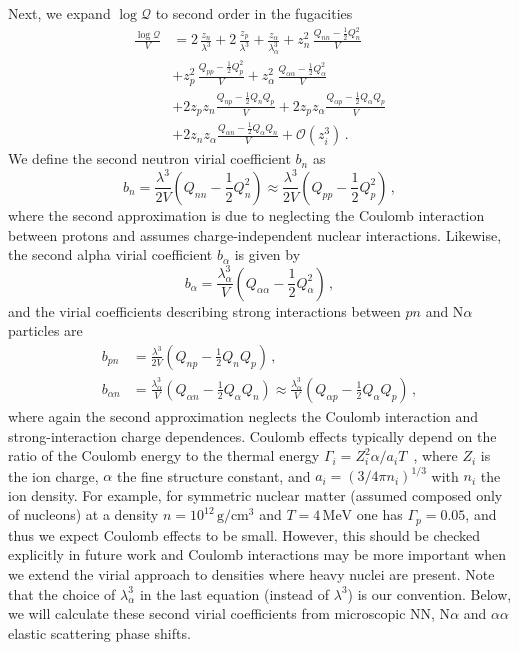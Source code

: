 \documentclass[aps,prc,twocolumn,showpacs,showkeys,amsmath,amssymb]{revtex4}
\newcommand{\mev}{\, \text{MeV}}
\newcommand{\gcq}{\, \text{g}/\text{cm}^{3}}
\begin{document}
Next, we expand $\log \mathcal{Q}$ to second order in the fugacities
\begin{align}
\frac{\log \mathcal{Q}}{V} &= 2 \, \frac{z_n}{\lambda^3} + 2 \, 
\frac{z_p}{\lambda^3} + \frac{z_\alpha}{\lambda_\alpha^3} +
z_n^2 \, \frac{Q_{nn}-\frac{1}{2}Q_n^2}{V} \nonumber \\[1mm]
&+ z_p^2 \, \frac{Q_{pp}-\frac{1}{2}Q_p^2}{V} 
+ z_\alpha^2 \, \frac{Q_{\alpha\alpha}-\frac{1}{2}Q_\alpha^2}{V} 
\nonumber \\[1mm]
&+ 2 z_p z_n \frac{Q_{np}-\frac{1}{2}Q_nQ_p}{V} 
+ 2 z_p z_\alpha \frac{Q_{\alpha p}-\frac{1}{2}Q_\alpha Q_p}{V} 
\nonumber \\[1mm]
&+ 2 z_n z_\alpha \frac{Q_{\alpha n}-\frac{1}{2}Q_\alpha Q_n}{V} 
+ \mathcal{O}(z_i^3) \,.
\end{align}
We define the second neutron virial coefficient $b_n$ as
\begin{equation}
b_n = \frac{\lambda^3}{2V}(Q_{nn}-\frac{1}{2}Q_n^2) \approx 
\frac{\lambda^3}{2V}(Q_{pp}-\frac{1}{2}Q_p^2) \,,
\end{equation}
where the second approximation is due to neglecting the Coulomb 
interaction between protons and assumes charge-independent
nuclear interactions.  Likewise, the second alpha virial coefficient 
$b_\alpha$ is given by
\begin{equation}
b_\alpha=\frac{\lambda_\alpha^3}{V}(Q_{\alpha\alpha}-\frac{1}{2}Q_\alpha^2) \,,
\end{equation}
and the virial coefficients describing strong interactions between 
$pn$ and N$\alpha$ particles are
\begin{align}
b_{pn}&=\frac{\lambda^3}{2V}(Q_{np}-\frac{1}{2}Q_nQ_p) \,, \\[1mm]
b_{\alpha n}&=\frac{\lambda_\alpha^3}{V}(Q_{\alpha n}-\frac{1}{2}Q_\alpha Q_n)
\approx \frac{\lambda_\alpha^3}{V}(Q_{\alpha p}-\frac{1}{2}Q_\alpha Q_p) \,,
\end{align}
where again the second approximation neglects the Coulomb 
interaction and strong-interaction charge dependences.
Coulomb effects typically depend on the ratio of the Coulomb energy to the
thermal energy $\Gamma_i = Z_i^2 \alpha/a_i T$~\cite{Ichimaru}, where
$Z_i$ is the ion charge, $\alpha$ the fine structure constant, and
$a_i = (3/4 \pi n_i)^{1/3}$ with $n_i$ the ion density. For example, for
symmetric nuclear matter (assumed composed only of nucleons) at a density
$n=10^{12} \gcq$ and $T=4 \mev$ one has $\Gamma_p = 0.05$, and thus we
expect Coulomb effects to be small. However, this should be checked
explicitly in future work and Coulomb interactions may be more important
when we extend the virial approach to densities where heavy nuclei are
present.
Note that the choice of $\lambda_\alpha^3$ in the last 
equation (instead of $\lambda^3$) is our convention.  Below, we will 
calculate these second virial coefficients from microscopic NN, N$\alpha$  
and $\alpha\alpha$ elastic scattering phase shifts.
\end{document}
